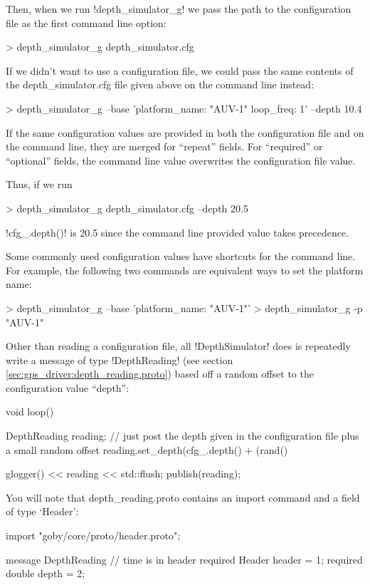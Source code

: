 Then, when we run !depth_simulator_g! we pass the path to the configuration file as the first command line option:
\begin{boxedverbatim}
> depth_simulator_g depth_simulator.cfg 
\end{boxedverbatim}
\resetbvlinenumber

If we didn't want to use a configuration file, we could pass the same contents of the depth\_simulator.cfg file given above on the command line instead:
\begin{boxedverbatim}
> depth_simulator_g --base 'platform_name: "AUV-1" loop_freq: 1' --depth 10.4
\end{boxedverbatim}
\resetbvlinenumber

If the same configuration values are provided in both the configuration file and on the command line, they are merged for ``repeat'' fields. For ``required'' or ``optional'' fields, the command line value overwrites the configuration file value. 

Thus, if we run
\begin{boxedverbatim}
> depth_simulator_g depth_simulator.cfg --depth 20.5
\end{boxedverbatim}
\resetbvlinenumber
!cfg_.depth()! is 20.5 since the command line provided value takes precedence.

Some commonly used configuration values have shortcuts for the command line. For example, the following two commands are equivalent ways to set the platform name:
\begin{boxedverbatim}
> depth_simulator_g --base 'platform_name: "AUV-1"'
> depth_simulator_g -p "AUV-1"
\end{boxedverbatim}
\resetbvlinenumber

Other than reading a configuration file, all !DepthSimulator! does is repeatedly write a message of type !DepthReading! (see section \ref{sec:gps_driver:depth_reading.proto}) based off a random offset to the configuration value ``depth'':
\begin{boxedverbatim}
void loop()
    {
       DepthReading reading;
       // just post the depth given in the configuration file plus a small random offset
       reading.set_depth(cfg_.depth() + (rand() %

       glogger() << reading << std::flush;
       publish(reading);    
    }
\end{boxedverbatim}
\resetbvlinenumber

You will note that depth\_reading.proto contains an import command and a field of type `Header':
\begin{boxedverbatim}
import "goby/core/proto/header.proto";

message DepthReading
{
  // time is in header
  required Header header = 1;
  required double depth = 2;
}
\end{boxedverbatim}
\resetbvlinenumber

